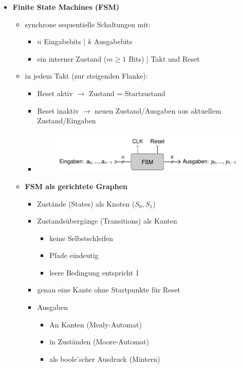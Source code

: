 \documentclass[11pt,a4paper]{article}
\begin{document}
\begin{itemize}

\item \textbf{Finite State Machines (FSM)}
	\begin{itemize}
	
	
	\item synchrone sequentielle Schaltungen mit:
		\begin{itemize}
		\item $n$ Eingabebits | $k$ Ausgabebits
		\item ein interner Zustand ($m \geq 1$ Bits) | Takt und Reset
		\end{itemize}
		
	\item in jedem Takt (zur steigenden Flanke):
		\begin{itemize}
		\item Reset aktiv $\rightarrow$ Zustand = Startzustand
		\item Reset inaktiv $\rightarrow$ neuen Zustand/Ausgaben aus aktuellem Zustand/Eingaben 
		\item[] \begin{figure}[H]
				\begin{center}
				\includegraphics[height=2cm]{fsm1}
				\end{center}
				\end{figure}
		\end{itemize}
	
\item \textbf{FSM als gerichtete Graphen}
	\begin{itemize}
	
	\item  Zustände (States) als Knoten ($S_0,S_1$)
	\item Zustandsübergänge (Transitions) als Kanten
		\begin{itemize}
		\item keine Selbstschleifen
		\item Pfade eindeutig
		\item leere Bedingung entspricht 1
		\end{itemize}
	\item genau eine Kante ohne Startpunkte für Reset
	\item Ausgaben
		\begin{itemize}
		\item An Kanten (Mealy-Automat)
		\item in Zuständen (Moore-Automat)
		\item als boole'scher Ausdruck (Mintern)
		\end{itemize}
	

\end{itemize}
\end{itemize}
\end{itemize}
\end{document}
